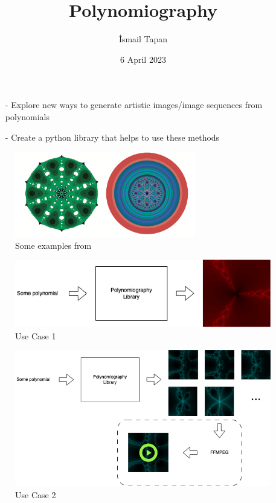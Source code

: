 \documentclass{beamer}
\begin{document}
 
\begin{frontpage}
	\title{Polynomiography}
	\author{İsmail Tapan}
	\date{6 April 2023}
\end{frontpage}

\begin{projectdefinition}
    \begin{itemize}
        \item[-] Explore new ways to generate  artistic images/image sequences from polynomials
        \item[-] Create a python library that helps to use these methods
    \end{itemize}
    \begin{figure}[h]
        \centering
        \includegraphics[width=0.7\textwidth]{fig1}
        \caption{Some examples from \citet{Kalantari_2008}}
    \end{figure}
\end{projectdefinition}

\begin{projectdesign}
	\begin{figure}[h]
		\centering
		\includegraphics[width=1\textwidth]{fig2}
		\caption{Use Case 1}
	\end{figure}
\end{projectdesign}

\begin{projectdesign}
	\begin{figure}[h]
		\centering
		\includegraphics[width=1\textwidth]{fig3}
		\caption{Use Case 2}
	\end{figure}
\end{projectdesign}
\end{document}
